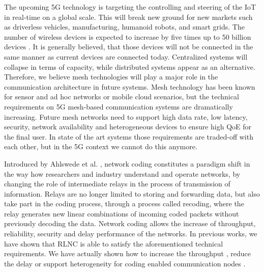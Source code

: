 %

The upcoming 5G technology is targeting the controlling and steering of the \ac{IoT} in real-time on a global scale. This will break new ground for new markets such as driverless vehicles, manufacturing, humanoid robots, and smart grids. The number of wireless devices is expected to increase by five times up to 50 billion devices \cite{cisco2011forecast}. It is generally believed, that those devices will not be connected in the same manner as current devices are connected today. Centralized systems will collapse in terms of capacity, while distributed systems appear as an alternative. Therefore, we believe mesh technologies will play a major role in the communication architecture in future systems. Mesh technology has been known for sensor and ad hoc networks or mobile cloud scenarios, but the technical requirements on 5G mesh-based communication systems are dramatically increasing. Future mesh networks need to support high data rate, low latency, security, network availability and heterogeneous devices to ensure high \ac{QoE} for the final user. In state of the art systems those requirements are traded-off with each other, but in the 5G context we cannot do this anymore.

Introduced by Ahlswede et al. \cite{ahlswede2000network}, network coding constitutes a paradigm shift in the way how researchers and industry understand and operate networks, by changing the role of intermediate relays in the process of transmission of information. Relays are no longer limited to storing and forwarding data, but also take part in the coding process, through a process called recoding, where the relay generates new linear combinations of incoming coded packets without previously decoding the data. Network coding allows the increase of throughput, reliability, security and delay performance of the networks. In previous works, we have shown that \ac{RLNC} \cite{koetter2003algebraic,ho2006random} is able to satisfy the aforementioned technical requirements. We have actually shown how to increase the throughput \cite{pahlevani2013playncool}, reduce the delay \cite{szabo2015towards} or support heterogeneity for coding enabled communication nodes \cite{lucani2014fulcrum}.

